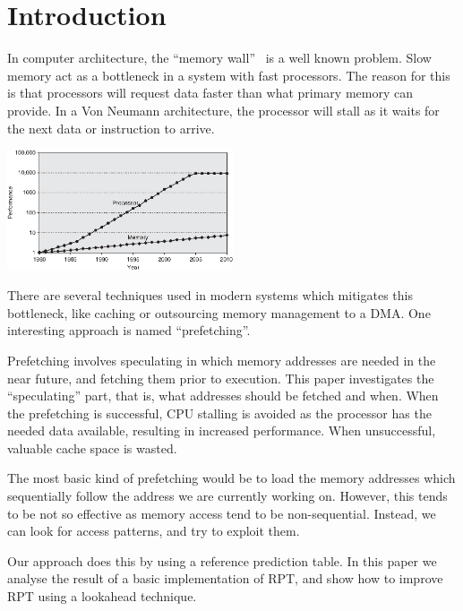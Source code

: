 \section{Introduction} %


In computer architecture, the ``memory wall''~\cite{wulf_mckee_1995}
is a well known problem. Slow memory act as a bottleneck in a system
with fast processors. The reason for this is that processors will
request data faster than what primary memory can provide. In a Von
Neumann architecture, the processor
will stall as it waits for the next data or instruction to arrive.

\begin{center}
  \includegraphics[width=0.5\textwidth]{graphs/memorywall}
\end{center}

There are several techniques used in modern systems which mitigates
this bottleneck, like caching or outsourcing memory management to a
DMA. One interesting approach is named ``prefetching''.

Prefetching involves speculating in which memory addresses are needed
in the near future, and fetching them prior to execution. This paper
investigates the ``speculating'' part, that is, what addresses should
be fetched and when. When the prefetching is successful, CPU stalling
is avoided as the processor has the needed data available, resulting
in increased performance. When unsuccessful, valuable cache space is
wasted.

The most basic kind of prefetching would be to load the memory
addresses which sequentially follow the address we are currently
working on. However, this tends to be not so effective as memory
access tend to be non-sequential. Instead, we can look for access
patterns, and try to exploit them.

Our approach does this by using a reference prediction table.  In this
paper we analyse the result of a basic implementation of RPT, and show
how to improve RPT using a lookahead technique.

